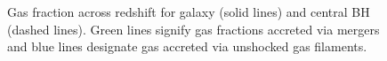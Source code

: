 \documentclass[manuscript]{aastex}
\begin{document}
\begin{figure}
\centerline{}
\caption[]{Gas fraction across redshift for galaxy (solid lines) and central BH (dashed lines). Green lines signify gas fractions accreted via mergers and blue lines designate gas accreted via unshocked gas filaments.}
\label{h258numfrac} 
\end{figure}
\end{document}
